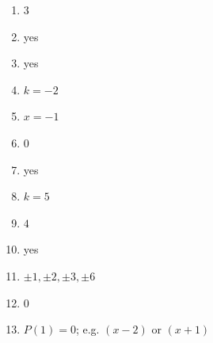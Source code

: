 \documentclass[11pt]{article}
\begin{document}
\begin{keybox}
\begin{multicols}{2}
\small
\begin{enumerate}[leftmargin=*,itemsep=3pt]
  \item $3$
  \item yes
  \item yes
  \item $k=-2$
  \item $x=-1$
  \item $0$
  \item yes
  \item $k=5$
  \item $4$
  \item yes
  \item $\pm1,\pm2,\pm3,\pm6$
  \item $0$
  \item $P(1)=0$; e.g. $(x-2)$ or $(x+1)$
\end{enumerate}
\end{multicols}
\end{keybox}
\end{document}
